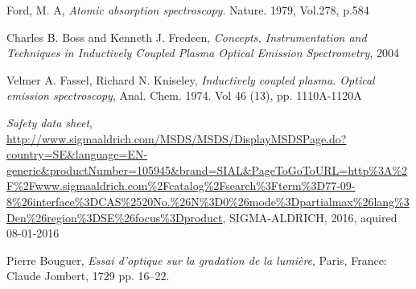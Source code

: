 \documentclass[11pt]{article}
\begin{document}

\clearpage


\clearpage

\clearpage

\clearpage

\clearpage

\clearpage

\clearpage

\clearpage
\begin{thebibliography}{9}
        Ford, M. A,
        \emph{Atomic absorption spectroscopy}.
        Nature. 1979, Vol.278, p.584
    
        Charles B. Boss and Kenneth J. Fredeen,
        \emph{Concepts, Instrumentation and Techniques in Inductively Coupled Plasma Optical Emission Spectrometry},
        2004
        
        Velmer A. Fassel, Richard N. Kniseley,
        \emph{Inductively coupled plasma. Optical emission spectroscopy},
        Anal. Chem. 1974. Vol 46 (13), pp. 1110A-1120A

        \emph{Safety data sheet},
\url{http://www.sigmaaldrich.com/MSDS/MSDS/DisplayMSDSPage.do?country=SE&language=EN-generic&productNumber=105945&brand=SIAL&PageToGoToURL=http%3A%2F%2Fwww.sigmaaldrich.com%2Fcatalog%2Fsearch%3Fterm%3D77-09-8%26interface%3DCAS%2520No.%26N%3D0%26mode%3Dpartialmax%26lang%3Den%26region%3DSE%26focus%3Dproduct},
    SIGMA-ALDRICH, 2016, aquired 08-01-2016
    
        Pierre Bouguer,
        \emph{Essai d'optique sur la gradation de la lumière},
        Paris, France: Claude Jombert, 1729 pp. 16–22.
    
    

\end{thebibliography}
\clearpage

\appendix
\begin{appendices}
  
\end{appendices}
\end{document}
